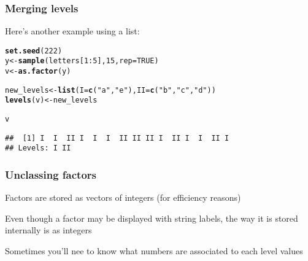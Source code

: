 \documentclass[12pt]{beamer}\usepackage[]{graphicx}\usepackage[]{color}
\makeatletter
\newcommand{\hlnum}[1]{\textcolor[rgb]{0.686,0.059,0.569}{#1}}%
\newcommand{\hlstr}[1]{\textcolor[rgb]{0.192,0.494,0.8}{#1}}%
\newcommand{\hlopt}[1]{\textcolor[rgb]{0,0,0}{#1}}%
\newcommand{\hlstd}[1]{\textcolor[rgb]{0.345,0.345,0.345}{#1}}%
\newcommand{\hlkwb}[1]{\textcolor[rgb]{0.69,0.353,0.396}{#1}}%
\newcommand{\hlkwc}[1]{\textcolor[rgb]{0.333,0.667,0.333}{#1}}%
\newcommand{\hlkwd}[1]{\textcolor[rgb]{0.737,0.353,0.396}{\textbf{#1}}}%
\newenvironment{kframe}{%
 \def\at@end@of@kframe{}%
 \ifinner\ifhmode%
  \def\at@end@of@kframe{\end{minipage}}%
  \begin{minipage}{\columnwidth}%
 \fi\fi%
 \def\FrameCommand##1{\hskip\@totalleftmargin \hskip-\fboxsep
 \colorbox{shadecolor}{##1}\hskip-\fboxsep
     \hskip-\linewidth \hskip-\@totalleftmargin \hskip\columnwidth}%
 \MakeFramed {\advance\hsize-\width
   \@totalleftmargin\z@ \linewidth\hsize
   \@setminipage}}%
 {\par\unskip\endMakeFramed%
 \at@end@of@kframe}
\newenvironment{knitrout}{}{} %
\makeatother
\begin{document}

\begin{frame}[fragile]
\frametitle{Merging levels}

Here's another example using a list:
\begin{knitrout}\footnotesize
{}\color{fgcolor}\begin{kframe}
\begin{alltt}
\hlkwd{set.seed}\hlstd{(}\hlnum{222}\hlstd{)}
\hlstd{y} \hlkwb{<-} \hlkwd{sample}\hlstd{(letters[}\hlnum{1}\hlopt{:}\hlnum{5}\hlstd{],} \hlnum{15}\hlstd{,} \hlkwc{rep} \hlstd{=} \hlnum{TRUE}\hlstd{)}
\hlstd{v} \hlkwb{<-} \hlkwd{as.factor}\hlstd{(y)}

\hlstd{new_levels} \hlkwb{<-} \hlkwd{list}\hlstd{(}\hlkwc{I} \hlstd{=} \hlkwd{c}\hlstd{(}\hlstr{"a"}\hlstd{,} \hlstr{"e"}\hlstd{),} \hlkwc{II} \hlstd{=} \hlkwd{c}\hlstd{(}\hlstr{"b"}\hlstd{,} \hlstr{"c"}\hlstd{,} \hlstr{"d"}\hlstd{))}
\hlkwd{levels}\hlstd{(v)} \hlkwb{<-} \hlstd{new_levels}

\hlstd{v}
\end{alltt}
\begin{verbatim}
##  [1] I  I  II I  I  I  II II II I  II I  I  II I 
## Levels: I II
\end{verbatim}
\end{kframe}
\end{knitrout}

\end{frame}


\begin{frame}
\frametitle{Unclassing factors}

\bi
  \item Factors are stored as vectors of integers (for efficiency reasons)
  \item Even though a factor may be displayed with string labels, the way it is stored internally is as integers
  \item Sometimes you'll nee to know what numbers are associated to each level values
\ei

\end{frame}

\end{document}
